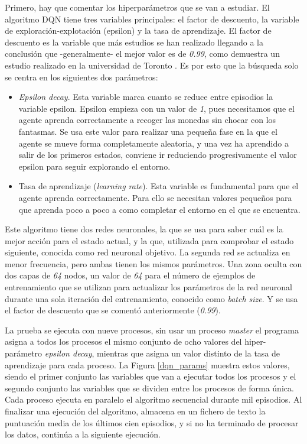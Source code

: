 Primero, hay que comentar los hiperparámetros que se van a estudiar. El algoritmo DQN tiene tres variables principales: el factor de descuento, la variable de exploración-explotación (epsilon) y la tasa de aprendizaje. El factor de descuento es la variable que más estudios se han realizado llegando a la conclusión que -generalmente- el mejor valor es de \textit{0.99}, como demuestra un estudio realizado en la universidad de Toronto \cite{pitis2019rethinking}. Es por esto que la búsqueda solo se centra en los siguientes dos parámetros:

\begin{itemize}
	\item \textit{Epsilon decay}. Esta variable marca cuanto se reduce entre episodios la variable epsilon. Epsilon empieza con un valor de \textit{1}, pues necesitamos que el agente aprenda correctamente a recoger las monedas sin chocar con los fantasmas. Se usa este valor para realizar una pequeña fase en la que el agente se mueve forma completamente aleatoria, y una vez ha aprendido a salir de los primeros estados, conviene ir reduciendo progresivamente el valor epsilon para seguir explorando el entorno. 
	
	\item Tasa de aprendizaje (\textit{learning rate}). Esta variable es fundamental para que el agente aprenda correctamente. Para ello se necesitan valores pequeños para que aprenda poco a poco a como completar el entorno en el que se encuentra.
\end{itemize}

Este algoritmo tiene dos redes neuronales, la que se usa para saber cuál es la mejor acción para el estado actual, y la que, utilizada para comprobar el estado siguiente, conocida como red neuronal objetivo. La segunda red se actualiza en menor frecuencia, pero ambas tienen los mismos parámetros. Una zona oculta con dos capas de \textit{64} nodos, un valor de \textit{64} para el número de ejemplos de entrenamiento que se utilizan para actualizar los parámetros de la red neuronal durante una sola iteración del entrenamiento, conocido como \textit{batch size}. Y se usa el factor de descuento que se comentó anteriormente (\textit{0.99}). 				


La prueba se ejecuta con nueve procesos, sin usar un proceso \textit{master} el programa asigna a todos los procesos el mismo conjunto de ocho valores del hiper-parámetro \textit{epsilon decay}, mientras que asigna un valor distinto de la tasa de aprendizaje para cada proceso. La Figura \ref{dqn_params} muestra estos valores, siendo el primer conjunto las variables que van a ejecutar todos los procesos y el segundo conjunto las variables que se dividen entre los procesos de forma única. Cada proceso ejecuta en paralelo el algoritmo secuencial durante mil episodios. Al finalizar una ejecución del algoritmo, almacena en un fichero de texto la puntuación media de los últimos cien episodios, y si no ha terminado de procesar los datos, continúa a la siguiente ejecución.

